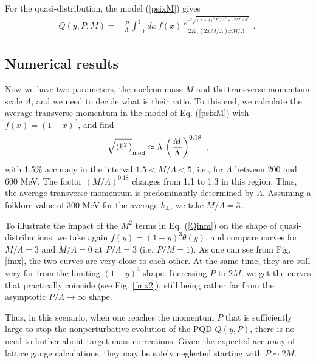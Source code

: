 \documentclass[final,5p,times,twocolumn]{elsarticle}
\begin{document}
For the quasi-distribution, the model (\ref{psixM})   gives  
 \begin{align}
 Q   (y, P;M)  = &\frac{P}{\Lambda}  \,  \int_{-1}^1 dx  \, f(x) \,  \frac{
  e^{-2 \sqrt{(x -y)^2 P^2/ \Lambda^2 +x^2 M^2/ \Lambda^2}  } }{2 K_1 (2 x M/ \Lambda)  {x M}/\Lambda}  \,
\  .
 \
 \label{Qinm}
\end{align} 






\subsection{Numerical results}

Now we have two parameters, the nucleon mass $M$ and 
the transverse momentum  scale $\Lambda$, and we need to decide
what is their ratio. To this end, we calculate the 
average transverse momentum in the model of Eq. (\ref{psixM}) with $f(x)= (1-x)^3$, 
and find 
\begin{align}
\sqrt{\langle k_\perp^2  \rangle}_{\rm mod}  \approx 
\Lambda \, \left (\frac{M}{\Lambda} \right )^{0.18} \  , 
 \label{kavn}
\end{align}
with 1.5\% accuracy in the interval $1.5 <M/\Lambda <5$, i.e., for $\Lambda$ between 200
and 600 MeV.   The factor $\left ({M}/{\Lambda} \right )^{0.18}$ changes from 1.1 to 1.3
in this region. Thus, the average  transverse momentum is predominantly determined by
$\Lambda$.   Assuming  a folklore  value of 300 MeV for the average $k_\perp$,
we take $M/\Lambda=3$. 




To illustrate the  impact  of the  $M^2$ terms in Eq. (\ref{Qinm}) 
on the shape of 
 quasi-distributions, we  take again  
$f(y)=(1-y)^3 \theta (y)$,    and compare curves for $M/\Lambda=3$ and
$M/\Lambda=0$ at $P/\Lambda=3$ (i.e. $P/M=1$).
As one can see from Fig. \ref{fmx}, the two curves are very 
close  to each other.  At the same time, they are still very far 
from the limiting $(1-y)^3$ shape.  Increasing $P$ to $2M$,
we get the curves that practically coincide (see  Fig. \ref{fmx2}), 
still being rather far from 
the asymptotic $P/\Lambda  \to \infty$ shape. 


    
    Thus,  in this scenario,  when one reaches  the momentum $P$ that 
     is sufficiently  large to stop  the nonperturbative 
    evolution of the  PQD $Q(y,P)$,
 there is no need to bother about   target mass corrections. 
    Given the expected accuracy of lattice gauge calculations,
    they  may be safely neglected starting with  $P\sim 2 M$. 
    
\end{document}

